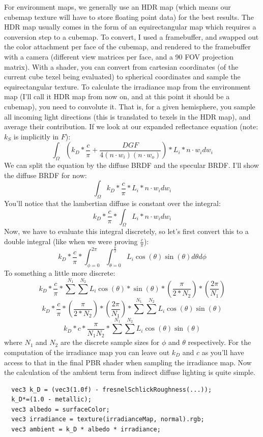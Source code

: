 \documentclass{article}
\begin{document}
For environment maps, we generally use an HDR map (which means our cubemap texture will have to store floating point data) for the best results.
The HDR map usually comes in the form of an equirectangular map which requires a conversion step to a cubemap. To convert, I used a framebuffer, and swapped
out the color attachment per face of the cubemap, and rendered to the framebuffer with a camera (different view matrices per face, and a 90 FOV projection matrix).
With a shader, you can convert from cartesian coordinates (of the current cube texel being evaluated) to spherical coordinates and sample the equirectangular texture.
To calculate the irradiance map from the environment map (I'll call it HDR map from now on, and at this point it should be a cubemap), you 
need to convolute it. That is, for a given hemisphere, you sample all incoming light directions (this is translated to texels in the HDR map), 
and average their contribution. If we look at our expanded reflectance equation (note: \(k_S\) is implicitly in \(F\)):
\[\int_{\Omega} (k_D*\frac{c}{\pi} + \frac{DGF}{4(n\cdot{w_i})(n\cdot{w_o})}) * L_i * n\cdot{w_i}dw_i\]
We can split the equation by the diffuse BRDF and the specular BRDF. I'll show the diffuse BRDF for now:
\[\int_{\Omega} k_D*\frac{c}{\pi} * L_i * n\cdot{w_i}dw_i \]
You'll notice that the lambertian diffuse is constant over the integral:
\[k_D * \frac{c}{\pi} * \int_{\Omega} L_i * n\cdot{w_i}dw_i\]
Now, we have to evaluate this integral discretely, so let's first convert this
to a double integral (like when we were proving \(\frac{c}{\pi}\)):
\[k_D * \frac{c}{\pi} * \int_{\phi = 0}^{2\pi} \int_{\theta = 0}^{\frac{\pi}{2}} L_i\cos(\theta)\sin(\theta) d\theta d\phi\]
To something a little more discrete:
\[k_D * \frac{c}{\pi} * \sum^{N_1}\sum^{N_2} L_i\cos(\theta) * \sin(\theta) * (\frac{\pi}{2*N_2}) * (\frac{2\pi}{N_1})\]
\[k_D * \frac{c}{\pi} * (\frac{\pi}{2*N_2}) * (\frac{2\pi}{N_1}) * \sum^{N_1}\sum^{N_2} L_i\cos(\theta)\sin(\theta)\]
\[k_D * c *\frac{\pi}{N_1  N_2} * \sum^{N_1}\sum^{N_2} L_i\cos(\theta)\sin(\theta)\]
where \(N_1\) and \(N_2\) are the discrete sample sizes for \(\phi\) and \(\theta\) respectively.
For the computation of the irradiance map you can leave out \(k_D\) and \(c\) as you'll have access to that 
in the final PBR shader when sampling the irradiance map. Now the calculation of the ambient term from indirect diffuse lighting is 
quite simple. 
\begin{verbatim}
  vec3 k_D = (vec3(1.0f) - fresnelSchlickRoughness(...));
  k_D*=(1.0 - metallic);
  vec3 albedo = surfaceColor;
  vec3 irradiance = texture(irradianceMap, normal).rgb;
  vec3 ambient = k_D * albedo * irradiance;
\end{verbatim}
\end{document}
